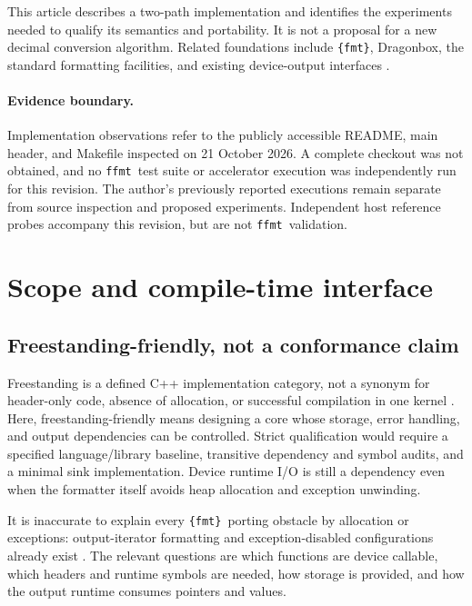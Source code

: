 \documentclass[11pt,letterpaper]{article}
\newcommand{\ffmt}{\texttt{ffmt}}
\newcommand{\fmtlib}{\texttt{\{fmt\}}}
\begin{document}
This article describes a two-path implementation and identifies the experiments
needed to qualify its semantics and portability. It is not a proposal for a
new decimal conversion algorithm. Related foundations include \fmtlib,
Dragonbox, the standard formatting facilities, and existing device-output
interfaces \cite{ffmt-readme,dragonbox,kokkos-printf,cuda-printf}.

\paragraph{Evidence boundary.}
Implementation observations refer to the publicly accessible README, main
header, and Makefile inspected on 21 October 2026. A complete checkout was not
obtained, and no \ffmt\ test suite or accelerator execution was independently
run for this revision. The author's previously reported executions remain
separate from source inspection and proposed experiments. Independent host
reference probes accompany this revision, but are not \ffmt\ validation.

\section{Scope and compile-time interface}

\subsection{Freestanding-friendly, not a conformance claim}

Freestanding is a defined C++ implementation category, not a synonym for
header-only code, absence of allocation, or successful compilation in one
kernel \cite{compliance}. Here, freestanding-friendly means designing a core
whose storage, error handling, and output dependencies can be controlled.
Strict qualification would require a specified language/library baseline,
transitive dependency and symbol audits, and a minimal sink implementation.
Device runtime I/O is still a dependency even when the formatter itself avoids
heap allocation and exception unwinding.

It is inaccurate to explain every \fmtlib\ porting obstacle by allocation or
exceptions: output-iterator formatting and exception-disabled configurations
already exist \cite{fmt-api}. The relevant questions are which functions are
device callable, which headers and runtime symbols are needed, how storage is
provided, and how the output runtime consumes pointers and values.
\end{document}
